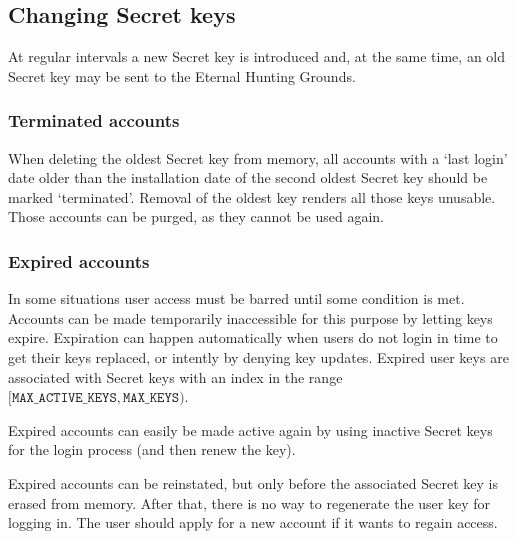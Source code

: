 \subsection{Changing Secret keys}
At regular intervals a new Secret key is introduced and,
at the same time,
an old Secret key may be sent to the Eternal Hunting Grounds.

\subsubsection{Terminated accounts}
When deleting the oldest Secret key from memory,
all accounts with a `last login' date older than the installation
date of the second oldest Secret key should be marked `terminated'.
Removal of the oldest key renders all those keys unusable.
Those accounts can be purged, as they cannot be used again.

\subsubsection{Expired accounts}
In some situations user access must be barred until some condition is met.
Accounts can be made temporarily inaccessible for this purpose by letting keys expire.
Expiration can happen automatically when users do not login in time to get their keys replaced,
or intently by denying key updates.
Expired user keys are associated with Secret keys with an index in the range $[\texttt{MAX\_ACTIVE\_KEYS},\texttt{MAX\_KEYS})$.
\par
Expired accounts can easily be made active again by using inactive Secret keys for the login process (and then renew the key).
\par
Expired accounts can be reinstated,
but only before the associated Secret key is erased from memory.
After that, there is no way to regenerate the user key for logging in.
The user should apply for a new account if it wants to regain access.
\clearpage
